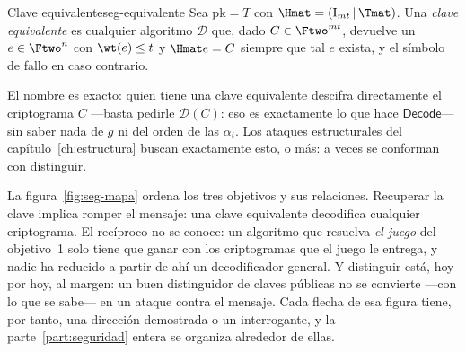 \begin{definicion}{Clave equivalente}{seg-equivalente}
Sea $\mathrm{pk}=T$ con $\Hmat=(\mathrm{I}_{mt}\,|\,\Tmat)$. Una
\emph{clave equivalente} es cualquier algoritmo $\mathcal{D}$ que,
dado $C\in\Ftwo^{mt}$, devuelve un $e\in\Ftwo^{n}$ con $\wt(e)\le t$
y $\Hmat e=C$ siempre que tal $e$ exista, y el símbolo de fallo en
caso contrario.
\end{definicion}

El nombre es exacto: quien tiene una clave equivalente descifra
directamente el criptograma $C$ ---basta pedirle $\mathcal{D}(C)$:
eso es exactamente lo que hace $\textsf{Decode}$--- sin saber nada
de $g$ ni del orden de las $\alpha_i$. Los ataques estructurales del
capítulo~\ref{ch:estructura} buscan exactamente esto, o más: a veces
se conforman con distinguir.

La figura~\ref{fig:seg-mapa} ordena los tres objetivos y sus
relaciones. Recuperar la clave implica romper el mensaje: una clave
equivalente decodifica cualquier criptograma. El recíproco no se
conoce: un algoritmo que resuelva \emph{el juego} del objetivo~1 solo
tiene que ganar con los criptogramas que el juego le entrega, y nadie
ha reducido a partir de ahí un decodificador general. Y distinguir
está, hoy por hoy, al margen: un buen distinguidor de claves públicas
no se convierte ---con lo que se sabe--- en un ataque contra el
mensaje. Cada flecha de esa figura tiene, por tanto, una dirección
demostrada o un interrogante, y la parte~\ref{part:seguridad} entera
se organiza alrededor de ellas.

